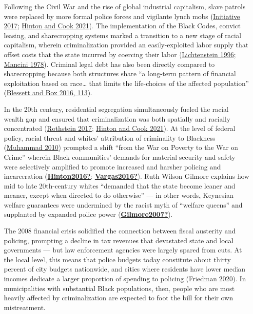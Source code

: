 \documentclass[
  12pt,
]{article}
\begin{document}
Following the Civil War and the rise of global industrial capitalism, slave patrols were replaced by more formal police forces and vigilante lynch mobs (\protect\hyperlink{ref-EqualJusticeInitiative2017}{Initiative 2017}; \protect\hyperlink{ref-Hinton2021}{Hinton and Cook 2021}). The implementation of the Black Codes, convict leasing, and sharecropping systems marked a transition to a new stage of racial capitalism, wherein criminalization provided an easily-exploited labor supply that offset costs that the state incurred by coercing their labor (\protect\hyperlink{ref-Lichtenstein1996}{Lichtenstein 1996}; \protect\hyperlink{ref-Mancini1978}{Mancini 1978}). Criminal legal debt has also been directly compared to sharecropping because both structures share ``a long-term pattern of financial exploitation based on race\ldots{} that limits the life-choices of the affected population'' (\protect\hyperlink{ref-Blessett2016}{Blessett and Box 2016, 113}).

In the 20th century, residential segregation simultaneously fueled the racial wealth gap and ensured that criminalization was both spatially and racially concentrated (\protect\hyperlink{ref-Rothstein2017}{Rothstein 2017}; \protect\hyperlink{ref-Hinton2021}{Hinton and Cook 2021}). At the level of federal policy, racial threat and whites' attribution of criminality to Blackness (\protect\hyperlink{ref-Muhammad2010}{Muhammad 2010}) prompted a shift ``from the War on Poverty to the War on Crime'' wherein Black communities' demands for material security and safety were selectively amplified to promote increased and harsher policing and incarceration (\protect\hyperlink{ref-Hinton2016}{\textbf{Hinton2016?}}; \protect\hyperlink{ref-Vargas2016}{\textbf{Vargas2016?}}). Ruth Wilson Gilmore explains how mid to late 20th-century whites ``demanded that the state become leaner and meaner, except when directed to do otherwise'' --- in other words, Keynesian welfare guarantees were undermined by the racist myth of ``welfare queens'' and supplanted by expanded police power (\protect\hyperlink{ref-Gilmore2007}{\textbf{Gilmore2007?}}).

The 2008 financial crisis solidified the connection between fiscal austerity and policing, prompting a decline in tax revenues that devastated state and local governments --- but law enforcement agencies were largely spared from cuts. At the local level, this means that police budgets today constitute about thirty percent of city budgets nationwide, and cities where residents have lower median incomes dedicate a larger proportion of spending to policing (\protect\hyperlink{ref-Friedman2020}{Friedman 2020}). In municipalities with substantial Black populations, then, people who are most heavily affected by criminalization are expected to foot the bill for their own mistreatment.
\end{document}
